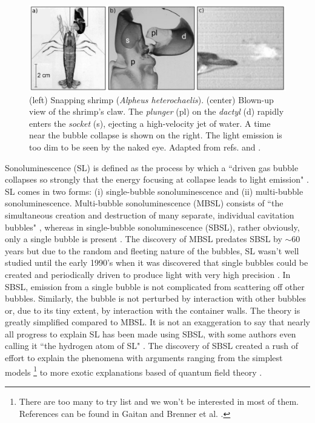 \documentclass[prb,aps,nofootinbib,superscriptaddress,floatfix]{revtex4-2}
\begin{document}
\begin{figure}
\includegraphics[width=0.95\linewidth]{figs/shrimp.pdf}
    \caption{(left) Snapping shrimp (\emph{Alpheus heterochaelis}). (center) Blown-up view of the shrimp's claw. The \emph{plunger} (pl) on the \emph{dactyl} (d) rapidly enters the \emph{socket} (s), ejecting a high-velocity jet of water. A time near the bubble collapse is shown on the right. The light emission is too dim to be seen by the naked eye. Adapted from refs. \cite{versluis2000snapping} and \cite{lohse2001snapping}.}
\label{fig:shrimp}
\end{figure}

Sonoluminescence (SL) is defined as the process by which a ``driven gas bubble collapses so strongly that the energy focusing at collapse leads to light emission" \cite{brenner2002single}. SL comes in two forms: (i) single-bubble sonoluminescence and (ii) multi-bubble sonoluminescence. Multi-bubble sonoluminescence (MBSL) consists of  ``the simultaneous creation and destruction of many separate, individual cavitation bubbles" \cite{crum1994sonoluminescence,brenner2002single}, whereas in single-bubble sonoluminescence (SBSL), rather obviously, only a single bubble is present \cite{gaitan1992sonoluminescence}. The discovery of MBSL predates SBSL by $\sim$60 years but due to the random and fleeting nature of the bubbles, SL wasn't well studied until the early 1990's when it was discovered that single bubbles could be created and periodically driven to produce light with very high precision \cite{crum1994sonoluminescence,gaitan1990experimental,gaitan1992sonoluminescence,brenner2002single}. In SBSL, emission from a single bubble is not complicated from scattering off other bubbles. Similarly, the bubble is not perturbed by interaction with other bubbles or, due to its tiny extent, by interaction with the container walls. The theory is greatly simplified compared to MBSL. It is not an exaggeration to say that nearly all progress to explain SL has been made using SBSL, with some authors even calling it ``the hydrogen atom of SL" \cite{lohse2018bubble,crum1994sonoluminescence}. The discovery of SBSL created a rush of effort to explain the phenomena with arguments ranging from the simplest models \footnote{There are too many to try list and we won't be interested in most of them. References can be found in Gaitan \cite{gaitan1990experimental} and Brenner et al. \cite{brenner2002single}.} to more exotic explanations based of quantum field theory \cite{schwinger1992casimir1,schwinger1992casimir2,schwinger1993casimir1,schwinger1993casimir2,schwinger1993casimir3,schwinger1993casimir4,schwinger1994casimir,eberlein1996sonoluminescence,liberati2000sonoluminescence}. 
\end{document}
